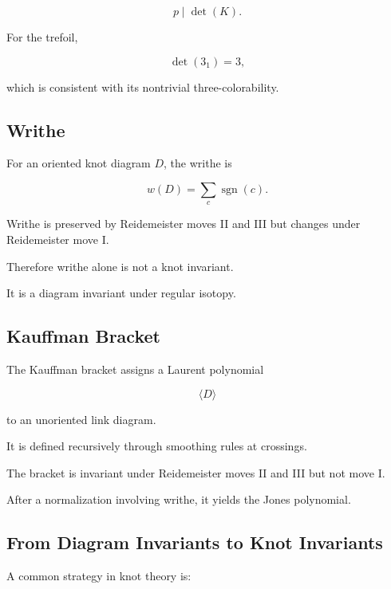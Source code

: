 \[
\boxed{
p\mid\det(K).
}
\]

For the trefoil,

\[
\det(3_1)=3,
\]

which is consistent with its nontrivial three-colorability.

\subsection{Writhe}
\label{subsec:knot-writhe}

For an oriented knot diagram \(D\), the writhe is

\[
\boxed{
w(D)
=
\sum_c\operatorname{sgn}(c).
}
\]

Writhe is preserved by Reidemeister moves II and III but changes under
Reidemeister move I.

Therefore writhe alone is not a knot invariant.

It is a diagram invariant under regular isotopy.

\subsection{Kauffman Bracket}
\label{subsec:kauffman-bracket}

The Kauffman bracket assigns a Laurent polynomial

\[
\boxed{
\langle D\rangle
}
\]

to an unoriented link diagram.

It is defined recursively through smoothing rules at crossings.

The bracket is invariant under Reidemeister moves II and III but not move I.

After a normalization involving writhe, it yields the Jones polynomial.

\subsection{From Diagram Invariants to Knot Invariants}
\label{subsec:diagram-to-knot-invariant}

A common strategy in knot theory is:

